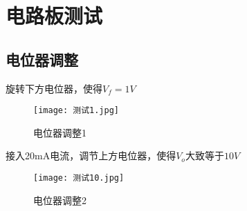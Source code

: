 \documentclass{zjureport}
\begin{document}
\section{电路板测试}
\subsection{电位器调整}
旋转下方电位器，使得$V_f = 1V$\par
\begin{figure}[H]
  \centering
  \texttt{[image: 测试1.jpg]}
  \caption{电位器调整1}
\end{figure}
接入20mA电流，调节上方电位器，使得$V_o \text{大致等于} 10V$\par
\begin{figure}[H]
  \centering
  \texttt{[image: 测试10.jpg]}
  \caption{电位器调整2}
\end{figure}
\end{document}
